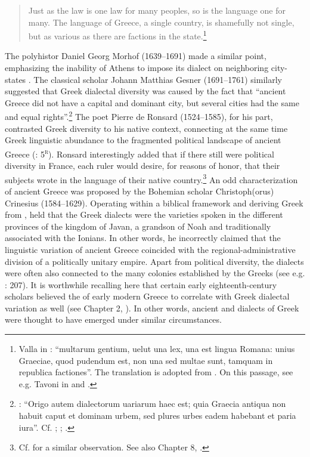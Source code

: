 \begin{quote}
Just as the  law is one law for many peoples, so is the  language one for many. The language of Greece, a single country, is shamefully not single, but as various as there are factions in the state.\footnote{Valla in \citet[122]{Regoliosi1993}: “multarum gentium, uelut una lex, una est lingua Romana: unius Graeciae, quod pudendum est, non una sed multae sunt, tamquam in republica factiones”. The translation is adopted from \citet[10]{Trapp1990}. On this passage, see e.g. Tavoni in \citet[90 n.55]{Benvoglienti1975} and \citet[212--213]{Trovato1984}.}
\end{quote}

The polyhistor Daniel Georg Morhof (1639–1691) made a similar point, emphasizing the inability of Athens to impose its dialect on neighboring city-states \citep[146]{Morhof1685}. The  classical scholar Johann Matthias Gesner (1691–1761) similarly suggested that Greek dialectal diversity was caused by the fact that “ancient Greece did not have a capital and dominant city, but several cities had the same and equal rights”.\footnote{\citet[160--161]{Gesner1774}: “Origo autem dialectorum uariarum haec est; quia Graecia antiqua non habuit caput et dominam urbem, sed plures urbes eadem habebant et paria iura”. Cf. \citet[395--396]{Rollin1731}; \citet[136--138]{Priestley1762}; \citet[204]{Ries1786}.} The poet Pierre de Ronsard (1524–1585), for his part, contrasted Greek diversity to his native  context, connecting at the same time Greek linguistic abundance to the fragmented political landscape of ancient Greece (\citeyear{Ronsard1565}: 5\textsc{\textsuperscript{r}}). Ronsard interestingly added that if there still were political diversity in France, each ruler would desire, for reasons of honor, that their subjects wrote in the language of their native country.\footnote{Cf. \citet[lxviii]{Court1778} for a similar observation. See also Chapter 8, .} An odd characterization of ancient Greece was proposed by the Bohemian  scholar Christoph(orus) Crinesius (1584–1629). Operating within a biblical framework and deriving Greek from , \citet[77]{Crinesius1629} held that the Greek dialects were the varieties spoken in the different provinces of the kingdom of Javan, a grandson of Noah and traditionally associated with the Ionians. In other words, he incorrectly claimed that the linguistic variation of ancient Greece coincided with the regional-administrative division of a politically unitary empire. Apart from political diversity, the dialects were often also connected to the many colonies established by the Greeks (see e.g. \citealt{Simonis1752}: 207). It is worthwhile recalling here that certain early eighteenth-century scholars believed the  of early modern Greece to correlate with  Greek dialectal variation as well (see Chapter 2, ). In other words, ancient and  dialects of Greek were thought to have emerged under similar circumstances.

